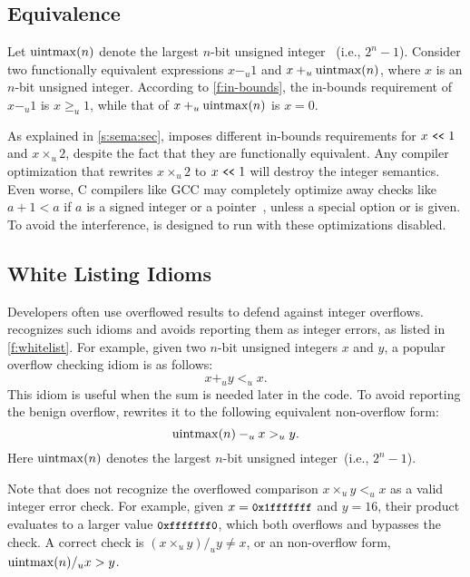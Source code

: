 \subsection{Equivalence}
\label{s:sema:eqv}

Let $\operatorname{uintmax}(n)$ denote the largest $n$-bit unsigned integer ~(i.e.,
$2^n-1$).  Consider two functionally equivalent expressions $x -_u
1$ and $x +_u \operatorname{uintmax}(n)$, where $x$ is an $n$-bit unsigned integer.
According to \autoref{f:in-bounds}, the in-bounds requirement of
$x -_u 1$ is $x \geq_u 1$, while that of $x +_u \operatorname{uintmax}(n)$ is $x
= 0$.

As explained in \autoref{s:sema:sec}, \sys imposes different in-bounds
requirements for $x \shl 1$ and $x \times_u 2$, despite the fact
that they are functionally equivalent.
Any compiler optimization that rewrites $x \times_u 2$ to $x \shl
1$ will destroy the integer semantics.
%
%
Even worse, C compilers like GCC may completely
optimize away checks like $a + 1 < a$ if $a$ is a signed integer
or a pointer~\cite{gcc:signed-overflow,us-cert:gcc}, unless a special
option  or  is
given.  To avoid the interference, \sys is designed to run with
these optimizations disabled.
\fi

\subsection{White Listing Idioms}
\label{s:sema:whitelist}

Developers often use overflowed results to defend against integer
overflows.  \sys recognizes such idioms and avoids reporting them
as integer errors, as listed in \autoref{f:whitelist}.  For example,
given two $n$-bit unsigned integers $x$ and $y$, a popular overflow
checking idiom is as follows:
\begin{equation*}
x +_u y <_u x.
\end{equation*}
This idiom is useful when the sum is needed later in the code.
To avoid reporting the benign overflow,
\sys rewrites it to the following equivalent non-overflow form:
\begin{equation*}
\operatorname{uintmax}(n) -_u x >_u y.
\end{equation*}
Here $\operatorname{uintmax}(n)$ denotes the largest $n$-bit unsigned integer~(i.e.,
$2^n - 1$).

Note that \sys does not recognize the overflowed comparison $x
\times_u y <_u x$ as a valid integer error check.  For example,
given $x = \cc{0x1fffffff}$ and $y = 16$, their product evaluates
to a larger value $\cc{0xfffffff0}$, which both overflows and
bypasses the check.  A correct check is $(x \times_u y) /_u y \neq
x$, or an non-overflow form, $\operatorname{uintmax}(n) /_u x > y$.

